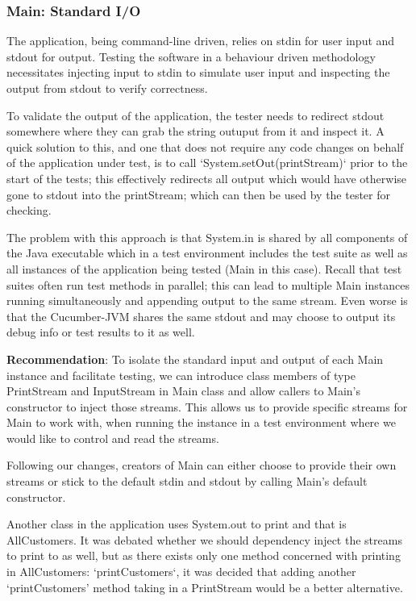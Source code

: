 \subsubsection{Main: Standard I/O}
The application, being command-line driven, relies on stdin for user input and stdout for output. Testing the software in a behaviour driven methodology necessitates injecting input to stdin to simulate user input and inspecting the output from stdout to verify correctness. 
\par
To validate the output of the application, the tester needs to redirect stdout somewhere where they can grab the string outuput from it and inspect it. A quick solution to this, and one that does not require any code changes on behalf of the application under test, is to call `System.setOut(printStream)` prior to the start of the tests; this effectively redirects all output which would have otherwise gone to stdout into the printStream; which can then be used by the tester for checking. 
\par
The problem with this approach is that System.in is shared by all components of the Java executable which in a test environment includes the test suite as well as all instances of the application being tested (Main in this case). Recall that test suites often run test methods in parallel; this can lead to multiple Main instances running simultaneously and appending output to the same stream. Even worse is that the Cucumber-JVM shares the same stdout and may choose to output its debug info or test results to it as well. 
\par 
\textbf{Recommendation}: To isolate the standard input and output of each Main instance and facilitate testing, we can introduce class members of type PrintStream and InputStream in Main class and allow callers to Main's constructor to inject those streams. 
This allows us to provide specific streams for Main to work with, when running the instance in a test environment where we would like to control and read the streams. 
\par 
Following our changes, creators of Main can either choose to provide their own streams or stick to the default stdin and stdout by calling Main's default constructor. 
\par
Another class in the application uses System.out to print and that is AllCustomers. It was debated whether we should dependency inject the streams to print to as well, but as there exists only one method concerned with printing in AllCustomers: `printCustomers`, it was decided that adding another `printCustomers' method taking in a PrintStream would be a better alternative.
